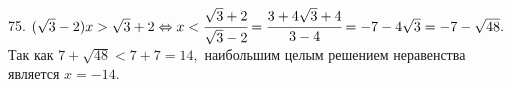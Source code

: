 75. $(\sqrt{3}-2)x>\sqrt{3}+2\Leftrightarrow x<\cfrac{\sqrt{3}+2}{\sqrt{3}-2}=\cfrac{3+4\sqrt{3}+4}{3-4}=-7-4\sqrt{3}=-7-\sqrt{48}.$ Так как $7+\sqrt{48}<7+7=14,$
наибольшим целым решением неравенства является $x=-14.$\\
